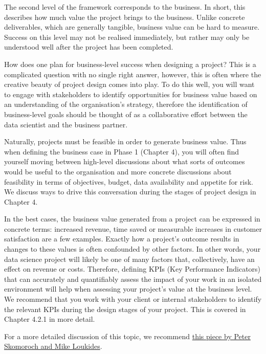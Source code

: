 \documentclass[
]{book}
\begin{document}
The second level of the framework corresponds to the business. In short,
this describes how much value the project brings to the business. Unlike
concrete deliverables, which are generally tangible, business value can
be hard to measure. Success on this level may not be realised
immediately, but rather may only be understood well after the project
has been completed.

How does one plan for business-level success when designing a project?
This is a complicated question with no single right answer, however,
this is often where the creative beauty of project design comes into
play. To do this well, you will want to engage with stakeholders to
identify opportunities for business value based on an understanding of
the organisation's strategy, therefore the identification of
business-level goals should be thought of as a collaborative effort
between the data scientist and the business partner.

Naturally, projects must be feasible in order to generate business
value. Thus when defining the business case in Phase 1 (Chapter 4), you
will often find yourself moving between high-level discussions about
what sorts of outcomes would be useful to the organisation and more
concrete discussions about feasibility in terms of objectives, budget,
data availability and appetite for risk. We discuss ways to drive this
conversation during the stages of project design in Chapter 4.

In the best cases, the business value generated from a project can be
expressed in concrete terms: increased revenue, time saved or measurable
increases in customer satisfaction are a few examples. Exactly how a
project's outcome results in changes to these values is often confounded
by other factors. In other words, your data science project will likely
be one of many factors that, collectively, have an effect on revenue or
costs. Therefore, defining KPIs (Key Performance Indicators) that can
accurately and quantifiably assess the impact of your work in an
isolated environment will help when assessing your project's value at
the business level. We recommend that you work with your client or
internal stakeholders to identify the relevant KPIs during the design
stages of your project. This is covered in Chapter 4.2.1 in more detail.

For a more detailed discussion of this topic, we recommend
\href{https://www.oreilly.com/radar/what-you-need-to-know-about-product-management-for-ai/}{this
piece by Peter Skomoroch and Mike Loukides}.
\end{document}
